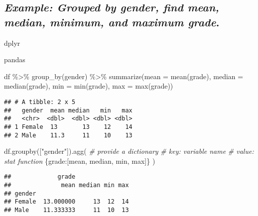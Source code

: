 \documentclass[
]{book}
\newenvironment{Shaded}{\begin{snugshade}}{\end{snugshade}}
\newcommand{\AttributeTok}[1]{\textcolor[rgb]{0.77,0.63,0.00}{#1}}
\newcommand{\CommentTok}[1]{\textcolor[rgb]{0.56,0.35,0.01}{\textit{#1}}}
\newcommand{\FunctionTok}[1]{\textcolor[rgb]{0.00,0.00,0.00}{#1}}
\newcommand{\NormalTok}[1]{#1}
\newcommand{\SpecialCharTok}[1]{\textcolor[rgb]{0.00,0.00,0.00}{#1}}
\newcommand{\StringTok}[1]{\textcolor[rgb]{0.31,0.60,0.02}{#1}}
\begin{document}
\hypertarget{example-grouped-by-gender-find-mean-median-minimum-and-maximum-grade.}{%
\subsection{\texorpdfstring{\emph{Example: Grouped by gender, find mean, median, minimum, and maximum grade}.}{Example: Grouped by gender, find mean, median, minimum, and maximum grade.}}\label{example-grouped-by-gender-find-mean-median-minimum-and-maximum-grade.}}

dplyr

pandas

\begin{Shaded}
\begin{Highlighting}[]
\NormalTok{df }\SpecialCharTok{\%\textgreater{}\%} 
  \FunctionTok{group\_by}\NormalTok{(gender) }\SpecialCharTok{\%\textgreater{}\%} 
  \FunctionTok{summarize}\NormalTok{(}\AttributeTok{mean =} \FunctionTok{mean}\NormalTok{(grade),}
            \AttributeTok{median =} \FunctionTok{median}\NormalTok{(grade),}
            \AttributeTok{min =} \FunctionTok{min}\NormalTok{(grade),}
            \AttributeTok{max =} \FunctionTok{max}\NormalTok{(grade))}
\end{Highlighting}
\end{Shaded}

\begin{verbatim}
## # A tibble: 2 x 5
##   gender  mean median   min   max
##   <chr>  <dbl>  <dbl> <dbl> <dbl>
## 1 Female  13       13    12    14
## 2 Male    11.3     11    10    13
\end{verbatim}

\begin{Shaded}
\begin{Highlighting}[]
\NormalTok{df.groupby([}\StringTok{"gender"}\NormalTok{]).agg(}
  \CommentTok{\# provide a dictionary}
  \CommentTok{\#   key: variable name}
  \CommentTok{\#   value: stat function}
\NormalTok{   \{}\StringTok{\textquotesingle{}grade\textquotesingle{}}\NormalTok{:[}\StringTok{\textquotesingle{}mean\textquotesingle{}}\NormalTok{,}
             \StringTok{\textquotesingle{}median\textquotesingle{}}\NormalTok{,}
             \StringTok{\textquotesingle{}min\textquotesingle{}}\NormalTok{,}
             \StringTok{\textquotesingle{}max\textquotesingle{}}\NormalTok{]\}}
\NormalTok{)}
\end{Highlighting}
\end{Shaded}

\begin{verbatim}
##             grade               
##              mean median min max
## gender                          
## Female  13.000000     13  12  14
## Male    11.333333     11  10  13
\end{verbatim}
\end{document}
